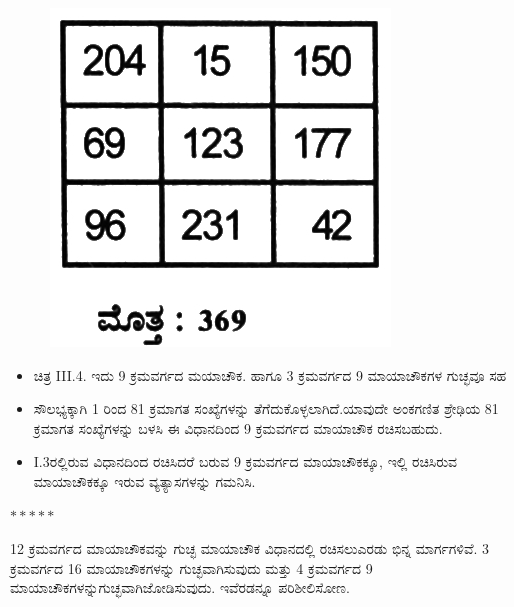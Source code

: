\begin{figure}[h]
\includegraphics[scale=.8]{src/figures/chap3/fig3.32.jpg}
\end{figure}

\begin{itemize}
	\item ಚಿತ್ರ  III.4. ಇದು 9 ಕ್ರಮವರ್ಗದ ಮಯಾಚೌಕ. ಹಾಗೂ 3 ಕ್ರಮವರ್ಗದ 9 ಮಾಯಾಚೌಕಗಳ ಗುಚ್ಛವೂ ಸಹ
	\item ಸೌಲಭ್ಯಕ್ಕಾಗಿ 1 ರಿಂದ 81 ಕ್ರಮಾಗತ ಸಂಖ್ಯೆಗಳನ್ನು ತೆಗೆದುಕೊಳ್ಳಲಾಗಿದೆ.\break ಯಾವುದೇ ಅಂಕಗಣಿತ ಶ್ರೇಢಿಯ 81 ಕ್ರಮಾಗತ ಸಂಖ್ಯೆಗಳನ್ನು ಬಳಸಿ ಈ ವಿಧಾನ\-ದಿಂದ 9 ಕ್ರಮವರ್ಗದ ಮಾಯಾಚೌಕ ರಚಿಸಬಹುದು.
	\item I.3ರಲ್ಲಿರುವ ವಿಧಾನದಿಂದ ರಚಿಸಿದರೆ ಬರುವ 9 ಕ್ರಮವರ್ಗದ ಮಾಯಾಚೌಕಕ್ಕೂ, ಇಲ್ಲಿ ರಚಿಸಿರುವ ಮಾಯಾಚೌಕಕ್ಕೂ ಇರುವ ವ್ಯತ್ಯಾಸಗಳನ್ನು ಗಮನಿಸಿ.
\end{itemize}
\begin{center}
$*****$
\end{center}

12 ಕ್ರಮವರ್ಗದ ಮಾಯಾಚೌಕವನ್ನು ಗುಚ್ಛ ಮಾಯಾಚೌಕ ವಿಧಾನದಲ್ಲಿ ರಚಿಸಲು\break ಎರಡು ಭಿನ್ನ ಮಾರ್ಗಗಳಿವೆ. 3 ಕ್ರಮವರ್ಗದ 16 ಮಾಯಾಚೌಕಗಳನ್ನು ಗುಚ್ಛವಾಗಿಸು\-ವುದು ಮತ್ತು 4 ಕ್ರಮವರ್ಗದ 9 ಮಾಯಾಚೌಕಗಳನ್ನುಗುಚ್ಛವಾಗಿಜೋಡಿಸುವುದು. ಇವೆರಡನ್ನೂ ಪರಿಶೀಲಿಸೋಣ.

